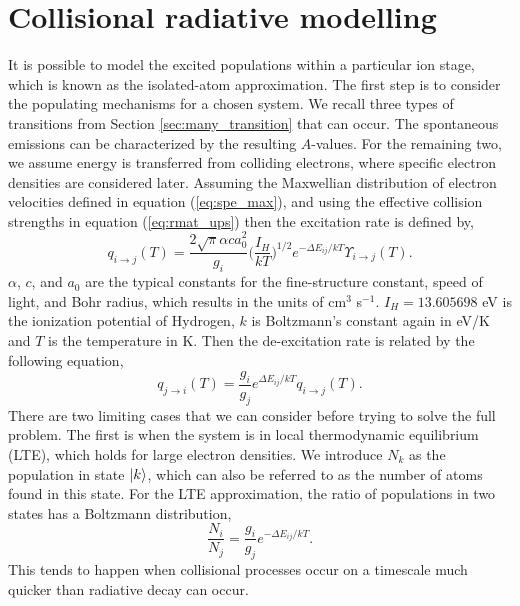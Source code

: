 \section{Collisional radiative modelling}
It is possible to model the excited populations within a particular ion stage, which is known as the isolated-atom approximation. The first step is to consider the populating mechanisms for a chosen system. We recall three types of transitions from Section \ref{sec:many_transition} that can occur. The spontaneous emissions can be characterized by the resulting $A$-values. For the remaining two, we assume energy is transferred from colliding electrons, where specific electron densities are considered later. Assuming the Maxwellian distribution of electron velocities defined in equation (\ref{eq:spe_max}), and using the effective collision strengths in equation (\ref{eq:rmat_ups}) then the excitation rate is defined by,
\begin{equation}\label{eq:spe_erate}
q_{i\rightarrow j }(T) = \frac{2\sqrt{\pi}\alpha c a_0^2}{g_i}\Big(\frac{I_H}{kT}\Big)^{1/2}e^{-\Delta E_{ij}/kT}\Upsilon_{i \rightarrow j}(T).
\end{equation}
$\alpha$, $c$, and $a_0$ are the typical constants for the fine-structure constant, speed of light, and Bohr radius, which results in the units of cm$^3$ s$^{-1}$. $I_H = 13.605698 $ eV is the ionization potential of Hydrogen, $k$ is Boltzmann's constant again in eV/K and $T$ is the temperature in K. Then the de-excitation rate is related by the following equation,
\begin{equation}\label{eq:spe_drate}
q_{j\rightarrow i}(T) = \frac{g_i}{g_j}e^{\Delta E_{ij}/kT}q_{i \rightarrow j}(T).
\end{equation}
There are two limiting cases that we can consider before trying to solve the full problem. The first is when the system is in local thermodynamic equilibrium (LTE), which holds for large electron densities. We introduce $N_k$ as the population in state $\Ket{k}$, which can also be referred to as the number of atoms found in this state. For the LTE approximation, the ratio of populations in two states has a Boltzmann distribution,
\begin{equation}\label{eq:spe_lte}
\frac{N_i}{N_j} = \frac{g_i}{g_j}e^{-\Delta E_{ij}/kT}.
\end{equation}
This tends to happen when collisional processes occur on a timescale much quicker than radiative decay can occur.

